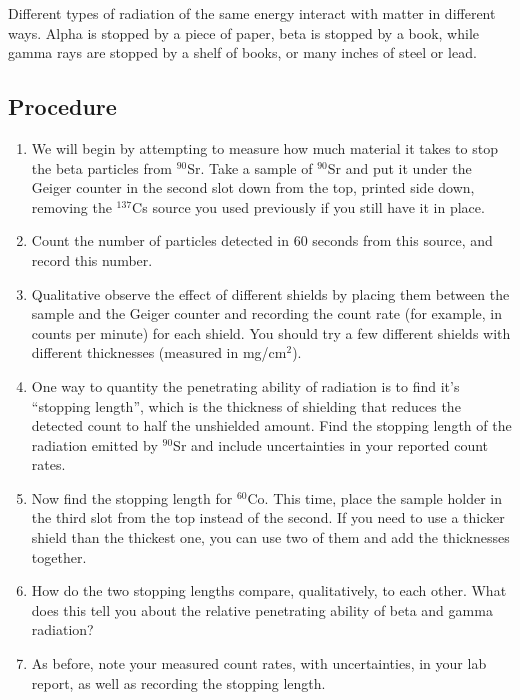 Different types of radiation of the same energy interact with matter in different ways.
Alpha is stopped by a piece of paper, beta is stopped by a book, while gamma rays are stopped by a shelf of books, or many inches of steel or lead.

\subsection{Procedure}

\begin{enumerate}
	\item We will begin by attempting to measure how much material it takes to stop the beta particles from $^{90}$Sr.
	Take a sample of $^{90}$Sr and put it under the Geiger counter in the second slot down from the top, printed side down, removing the $^{137}$Cs source you used previously if you still have it in place.
	
	\item Count the number of particles detected in 60 seconds from this source, and record this number.
	
	\item Qualitative observe the effect of different shields by placing them between the sample and the Geiger counter and recording the count rate (for example, in counts per minute) for each shield.
	You should try a few different shields with different thicknesses (measured in mg/cm$^2$).
	
	\item One way to quantity the penetrating ability of radiation is to find it's ``stopping length'', which is the thickness of shielding that reduces the detected count to half the unshielded amount. Find the stopping length of the radiation emitted by $^{90}$Sr and include uncertainties in your reported count rates.

	\item Now find the stopping length for $^{60}$Co. This time, place the sample holder in the third slot from the top instead of the second. If you need to use a thicker shield than the thickest one, you can use two of them and add the thicknesses together.
	
	\item How do the two stopping lengths compare, qualitatively, to each other. What does this tell you about the relative penetrating ability of beta and gamma radiation?
	
	\item As before, note your measured count rates, with uncertainties, in your lab report, as well as recording the stopping length.
	

\end{enumerate}
